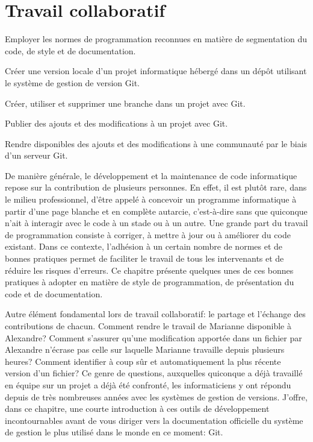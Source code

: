 
\chapter{Travail collaboratif}
\label{chap:collaboration}

\begin{objectifs}
\item Employer les normes de programmation reconnues en matière de
  segmentation du code, de style et de documentation.
\item Créer une version locale d'un projet informatique hébergé dans
  un dépôt utilisant le système de gestion de version Git.
\item Créer, utiliser et supprimer une branche dans un projet avec
  Git.
\item Publier des ajouts et des modifications à un projet avec Git.
\item Rendre disponibles des ajouts et des modifications à une
  communauté par le biais d'un serveur Git.
\end{objectifs}

De manière générale, le développement et la maintenance de code
informatique repose sur la contribution de plusieurs personnes. En
effet, il est plutôt rare, dans le milieu professionnel, d'être appelé
à concevoir un programme informatique à partir d'une page blanche et
en complète autarcie, c'est-à-dire sans que quiconque n'ait à
interagir avec le code à un stade ou à un autre. Une grande part du
travail de programmation consiste à corriger, à mettre à jour ou à
améliorer du code existant. Dans ce contexte, l'adhésion à un certain
nombre de normes et de bonnes pratiques permet de faciliter le travail
de tous les intervenants et de réduire les risques d'erreurs. Ce
chapitre présente quelques unes de ces bonnes pratiques à adopter en
matière de style de programmation, de présentation du code et de
documentation.

Autre élément fondamental lors de travail collaboratif: le partage et
l'échange des contributions de chacun. Comment rendre le travail de
Marianne disponible à Alexandre? Comment s'assurer qu'une modification
apportée dans un fichier par Alexandre n'écrase pas celle sur laquelle
Marianne travaille depuis plusieurs heures? Comment identifier à coup
sûr et automatiquement la plus récente version d'un fichier? Ce genre
de questions, auxquelles quiconque a déjà travaillé en équipe sur un
projet a déjà été confronté, les informaticiens y ont répondu depuis
de très nombreuses années avec les systèmes de gestion de versions.
J'offre, dans ce chapitre, une courte introduction à ces outils de
développement incontournables avant de vous diriger vers la
documentation officielle du système de gestion le plus utilisé dans le
monde en ce moment: Git.


